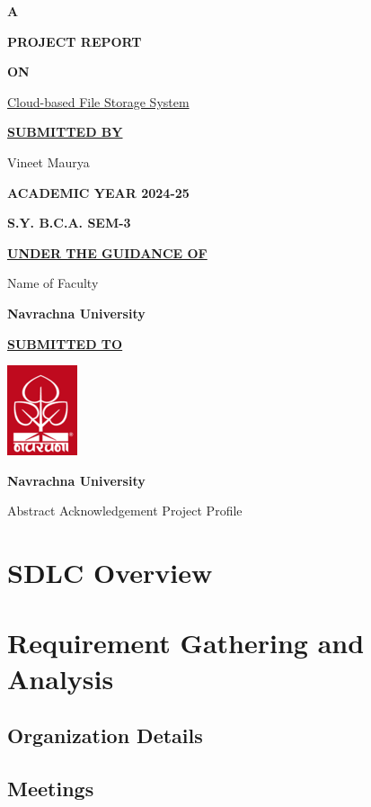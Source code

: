 \documentclass[12pt,a4paper]{report}
\begin{document}
\begin{center}
    \textbf{\LARGE{A}}

    \textbf{\LARGE{PROJECT REPORT}}

    \textbf{\LARGE{ON}}

    \Large{\underline{Cloud-based File Storage System}}
    \vspace{1cm}

    \textbf{\underline{SUBMITTED BY}}

    Vineet Maurya
    \vspace{1cm}

    \textbf{ACADEMIC YEAR 2024-25}

    \textbf{S.Y. B.C.A. SEM-3}
    \vspace{1cm}

    \textbf{\underline{UNDER THE GUIDANCE OF}}

    Name of Faculty

    \textbf{Navrachna University}
    \vspace{1cm}

    \textbf{\underline{SUBMITTED TO}}
    \vspace{0.5cm}

    \includegraphics{nuv_logo.png}
    \vspace{0.5cm}

    \textbf{Navrachna University}
\end{center}
\newpage
{}
\setcounter{page}{1}
Abstract
\newpage
Acknowledgement
\newpage
Project Profile
\newpage
{}
\tableofcontents
\newpage
{}
\setcounter{page}{1}
\chapter{SDLC Overview}
\newpage
\chapter{Requirement Gathering and Analysis}
\section{Organization Details}
\section{Meetings}
\end{document}
